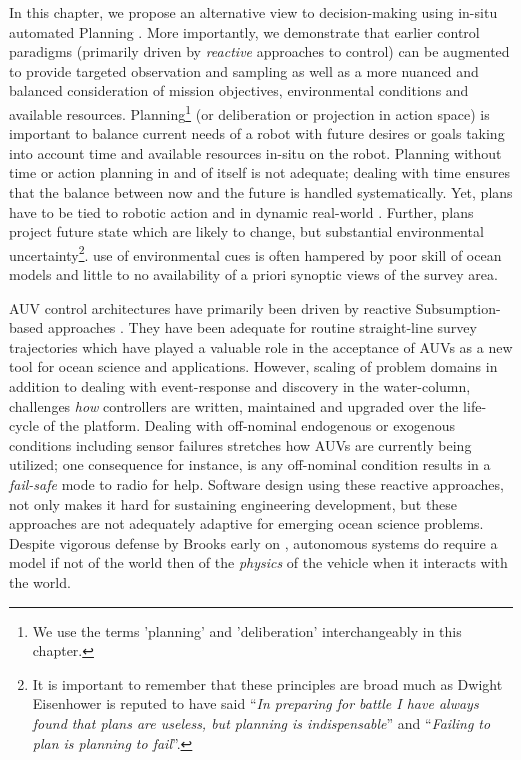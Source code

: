In this chapter, we propose an alternative view to decision-making
using in-situ automated Planning \cite{ghallab04}. More importantly,
we demonstrate that earlier control paradigms (primarily driven by
\emph{reactive} approaches to control) can be augmented to provide
targeted observation and sampling as well as a more nuanced and
balanced consideration of mission objectives, environmental conditions
and available resources. Planning\footnote{We use the terms 'planning'
  and 'deliberation' interchangeably in this chapter.}  (or
deliberation or projection in action space) is important to balance
current needs of a robot with future desires or goals taking into
account time and available resources in-situ on the robot. Planning
without time or action planning in and of itself is not adequate;
dealing with time ensures that the balance between now and the future
is handled systematically. Yet, plans have to be tied to robotic
action and in dynamic real-world . Further,
plans  project future state which are likely to
change, but  substantial environmental
uncertainty\footnote{It is important to remember that these principles
  are broad much as Dwight Eisenhower is reputed to have said
  ``\emph{In preparing for battle I have always found that plans are
    useless, but planning is indispensable}'' and ``\emph{Failing to
    plan is planning to fail}''.}.  use of environmental cues is often hampered by poor
 skill \cite{anderson2009} of ocean models and
little to no availability of a priori synoptic views of the survey
area. 


 AUV control architectures have primarily been
driven by reactive Subsumption-based approaches \cite{brooks86}. They
have been adequate for routine straight-line survey trajectories which
have played a valuable role in the acceptance of AUVs as a new tool
for ocean science and  applications. However,
scaling of problem domains in addition to dealing with event-response
and discovery in the water-column, challenges \emph{how} controllers
are written, maintained and upgraded over the life-cycle of the
platform. Dealing with off-nominal endogenous or exogenous conditions
including sensor failures stretches how AUVs are currently being
utilized; one consequence for instance, is any off-nominal condition
results in a \emph{fail-safe}  mode to radio for
help. Software design using these reactive approaches, not only makes
it hard for sustaining engineering development, but these approaches
are not adequately adaptive for emerging ocean science problems.
Despite vigorous defense by Brooks early on
\cite{Brooks91intelligencewithoutrea,Brooks91intelligencewithoutrep},
autonomous systems do require a model if not of the world then of the
\emph{physics} of the vehicle when it interacts with the world.



